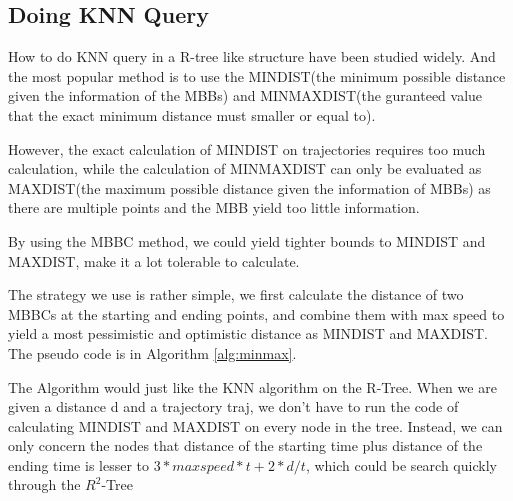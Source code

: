 \documentclass[sigplan]{acmart}
\begin{document}
\subsection{Doing KNN Query}
How to do KNN query in a R-tree like structure have been studied widely.\cite{nnq95} And the most popular method is to use the MINDIST(the minimum possible distance given the information of the MBBs) and MINMAXDIST(the guranteed value that the exact minimum distance must smaller or equal to).\par
However, the exact calculation of MINDIST on trajectories requires too much calculation, while the calculation of MINMAXDIST can only be evaluated as MAXDIST(the maximum possible distance given the information of MBBs) as there are multiple points and the MBB yield too little information.\par
By using the MBBC method, we could yield tighter bounds to MINDIST and MAXDIST, make it a lot tolerable to calculate. \par
The strategy we use is rather simple, we first calculate the distance of two MBBCs at the starting and ending points, and combine them with max speed to yield a most pessimistic and optimistic distance as MINDIST and MAXDIST. The pseudo code is in Algorithm \ref{alg:minmax}.\par
The Algorithm would just like the KNN algorithm on the R-Tree. When we are given a distance d and a trajectory traj, we don't have to run the code of calculating MINDIST and MAXDIST on every node in the tree. Instead, we can only concern the nodes that distance of the starting time plus distance of the ending time is lesser to $3* maxspeed* t + 2*d/t$, which could be search quickly through the $R^2$-Tree
\end{document}
